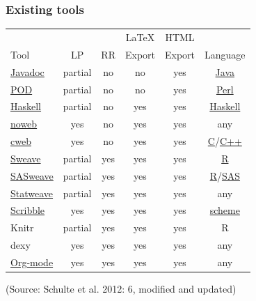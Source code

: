 \documentclass[bigger]{beamer}
\begin{document}
\begin{frame}
\frametitle{Existing tools}
\label{sec-2-1-3}



\begin{center}
\begin{tabular}{l|ccccc}
                                       &           &       &  \LaTeX{}  &  HTML    &                                                               \\
 Tool                                  &  LP       &  RR   &  Export    &  Export  &  Language                                                     \\
\hline
 \hyperref[latex-proglang]{Javadoc}    &  partial  &  no   &  no        &  yes     &  \hyperref[latex-proglang]{Java}                              \\
 \hyperref[latex-proglang]{POD}        &  partial  &  no   &  no        &  yes     &  \hyperref[latex-proglang]{Perl}                              \\
 \hyperref[latex-proglang]{Haskell}    &  partial  &  no   &  yes       &  yes     &  \hyperref[latex-proglang]{Haskell}                           \\
 \hyperref[latex-proglang]{noweb}      &  yes      &  no   &  yes       &  yes     &  any                                                          \\
 \hyperref[latex-proglang]{cweb}       &  yes      &  no   &  yes       &  yes     &  \hyperref[latex-proglang]{C}/\hyperref[latex-proglang]{C++}  \\
 \hyperref[latex-proglang]{Sweave}     &  partial  &  yes  &  yes       &  yes     &  \hyperref[latex-proglang]{R}                                 \\
 \hyperref[latex-proglang]{SASweave}   &  partial  &  yes  &  yes       &  yes     &  \hyperref[latex-proglang]{R}/\hyperref[latex-proglang]{SAS}  \\
 \hyperref[latex-proglang]{Statweave}  &  partial  &  yes  &  yes       &  yes     &  any                                                          \\
 \hyperref[latex-proglang]{Scribble}   &  yes      &  yes  &  yes       &  yes     &  \hyperref[latex-proglang]{scheme}                            \\
 Knitr                                 &  partial  &  yes  &  yes       &  yes     &  R                                                            \\
 dexy                                  &  yes      &  yes  &  yes       &  yes     &  any                                                          \\
 \hyperref[latex-proglang]{Org-mode}   &  yes      &  yes  &  yes       &  yes     &  any                                                          \\
\end{tabular}
\end{center}



(Source: Schulte et al. 2012: 6, modified and updated)
\end{frame}
\end{document}
